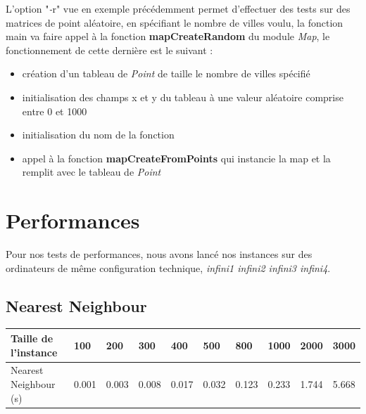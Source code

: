 \documentclass[12pt]{report}
\begin{document}
{{{{{{{L'option "\textit{-}r" vue en exemple précédemment permet d'effectuer des tests sur des matrices de point aléatoire, en spécifiant le nombre de villes voulu, la fonction main va faire appel à la fonction \textbf{mapCreateRandom} du module \textit{Map}, le fonctionnement de cette dernière est le suivant :
\begin{itemize}
	\item création d'un tableau de \textit{Point} de taille le nombre de villes spécifié
    \item initialisation des champs x et y du tableau à une valeur aléatoire comprise entre 0 et 1000
    \item initialisation du nom de la fonction
    \item appel à la fonction \textbf{mapCreateFromPoints} qui instancie la map et la remplit avec le tableau de \textit{Point}
\end{itemize}


\section{Performances}

Pour nos tests de performances, nous avons lancé nos instances sur des ordinateurs de même configuration technique, \textit{infini1 infini2 infini3 infini4}.

\subsection{Nearest Neighbour}

\newline

\begin{tabular}{|l|l|l|l|l|l|l|l|l|l|}
    \hline
    Taille de l'instance  & 100   & 200   & 300   & 400   & 500   & 800  & 1000  & 2000 & 3000 \\ \hline
    Nearest Neighbour (s) & 0.001 & 0.003 & 0.008 & 0.017 & 0.032 & 0.123 & 0.233 &  1.744 & 5.668  \\ \hline
\end{tabular}

}}}}}}}
\end{document}
